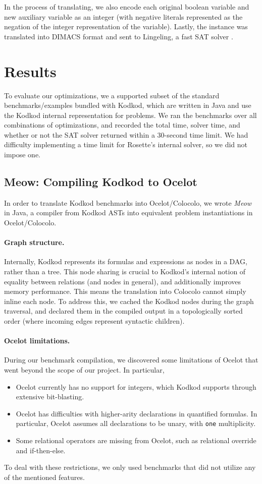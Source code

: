 \documentclass[10pt]{article}
\theoremstyle{definition}
\begin{document}
  In the process of translating, we also encode each original boolean variable and new auxiliary variable as an integer (with negative literals represented as the negation of the integer representation of the variable). Lastly, the instance was translated into DIMACS format and sent to Lingeling, a fast SAT solver \cite{biere17}.
  \section{Results}
  To evaluate our optimizations, we a supported subset of the standard benchmarks/examples bundled with Kodkod, which are written in Java and use the Kodkod internal representation for problems. We ran the benchmarks over all combinations of optimizations, and recorded the total time, solver time, and whether or not the SAT solver returned within a 30-second time limit. We had difficulty implementing a time limit for Rosette's internal solver, so we did not impose one.
  \subsection{Meow: Compiling Kodkod to Ocelot}
  In order to translate Kodkod benchmarks into Ocelot/Colocolo, we wrote \emph{Meow} in Java, a compiler from Kodkod ASTs into equivalent problem instantiations in Ocelot/Colocolo.
  \paragraph{Graph structure.} Internally, Kodkod represents its formulas and expressions as nodes in a DAG, rather than a tree. This node sharing is crucial to Kodkod's internal notion of equality between relations (and nodes in general), and additionally improves memory performance. This means the translation into Colocolo cannot simply inline each node. To address this, we cached the Kodkod nodes during the graph traversal, and declared them in the compiled output in a topologically sorted order (where incoming edges represent syntactic children).

  \paragraph{Ocelot limitations.} During our benchmark compilation, we discovered some limitations of Ocelot that went beyond the scope of our project. In particular,
  \begin{itemize}
    \item Ocelot currently has no support for integers, which Kodkod supports through extensive bit-blasting.
    \item Ocelot has difficulties with higher-arity declarations in quantified formulas. In particular, Ocelot assumes all declarations to be unary, with \texttt{one} multiplicity.
    \item Some relational operators are missing from Ocelot, such as relational override and if-then-else.
  \end{itemize}
  To deal with these restrictions, we only used benchmarks that did not utilize any of the mentioned features.
\end{document}
